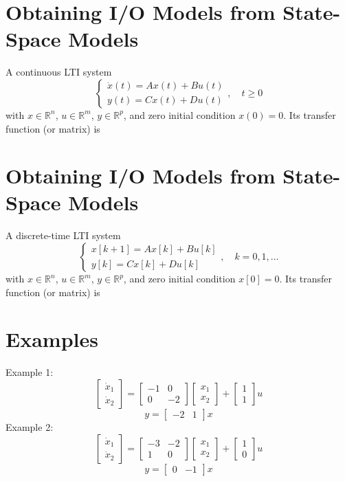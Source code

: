 \documentclass[10pt,a4paper,oneside]{article}
\begin{document}
\section{Obtaining I/O Models from State-Space Models}
A continuous LTI system
\[
\left\{\begin{array}{l}{\dot{x}(t)=A x(t)+B u(t)} \\ {y(t)=C x(t)+D u(t)}\end{array}, \quad t \geq 0\right.
\]
with $x\in\mathbb{R}^n$, $u\in\mathbb{R}^m$, $y\in\mathbb{R}^p$, and zero initial condition $x(0)=0$. Its transfer function (or matrix) is

\section{Obtaining I/O Models from State-Space Models}
A discrete-time LTI system
\[
\left\{\begin{array}{ll}{x[k+1]=A x[k]+B u[k]}  \\ {y[k]=C x[k]+D u[k]}\end{array}, \quad k=0,1, \ldots\right.
\]
with $x\in\mathbb{R}^n$, $u\in\mathbb{R}^m$, $y\in\mathbb{R}^p$, and zero initial condition $x[0]=0$. Its transfer function (or matrix) is
\section{Examples}
Example 1:
\[
\left[\begin{array}{l}{\dot{x}_{1}} \\ {\dot{x}_{2}}\end{array}\right]=\left[\begin{array}{cc}{-1} & {0} \\ {0} & {-2}\end{array}\right]\left[\begin{array}{l}{x_{1}} \\ {x_{2}}\end{array}\right]+\left[\begin{array}{l}{1} \\ {1}\end{array}\right] u
\]
\[
y=\left[\begin{array}{ll}{-2} & {1}\end{array}\right] x
\]
Example 2:
\[
\left[\begin{array}{l}{\dot{x}_{1}} \\ {\dot{x}_{2}}\end{array}\right]=\left[\begin{array}{cc}{-3} & {-2} \\ {1} & {0}\end{array}\right]\left[\begin{array}{l}{x_{1}} \\ {x_{2}}\end{array}\right]+\left[\begin{array}{l}{1} \\ {0}\end{array}\right] u
\]
\[
y=\left[\begin{array}{ll}{0} & {-1}\end{array}\right] x
\]
\end{document}
